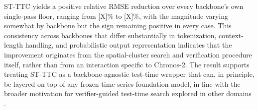 \documentclass[preprint,12pt]{elsarticle}
\begin{document}
\begin{table}[htbp]
\centering
\small
\renewcommand{\arraystretch}{1.2}
\caption{Effect of swapping the frozen backbone $p_\theta$: single-pass (no TTC) vs.\ our full method, on the same ERA5 setup (metrics averaged over all grid points and the three variables t2m, u10, v10). $\Delta$ RMSE (\%) is the relative RMSE reduction of our method over the single-pass forecast of the same backbone. A consistent positive $\Delta$ across backbones would indicate that the gain stems from the composite verifier and Best-of-$N$ search rather than from any Chronos-2-specific property.}
\label{tab:ablation_backbones}
\end{table}

ST-TTC yields a positive relative RMSE reduction over every backbone's own single-pass floor, ranging from [X]\% to [X]\%, with the magnitude varying somewhat by backbone but the sign remaining positive in every case. This consistency across backbones that differ substantially in tokenization, context-length handling, and probabilistic output representation indicates that the improvement originates from the spatial-cluster search and verification procedure itself, rather than from an interaction specific to Chronos-2. The result supports treating ST-TTC as a backbone-agnostic test-time wrapper that can, in principle, be layered on top of any frozen time-series foundation model, in line with the broader motivation for verifier-guided test-time search explored in other domains \citep{snell2024scaling,liu2025videot1,ji2025survey}.
\end{document}
